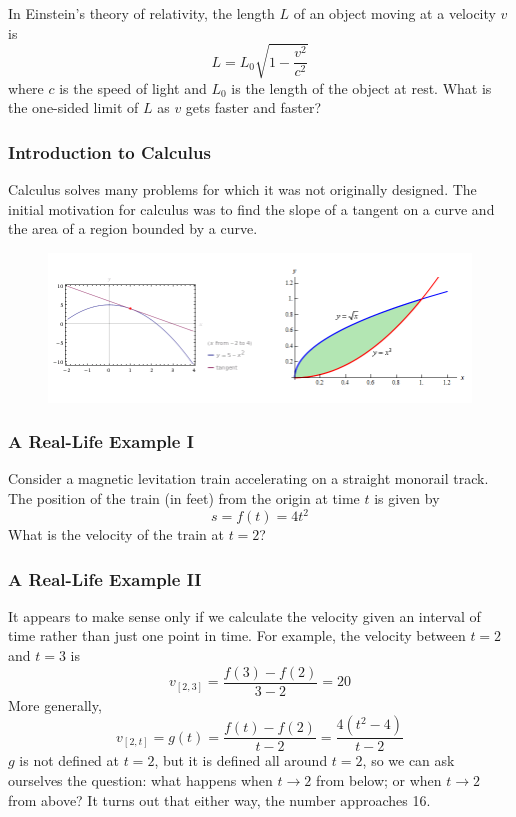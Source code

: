 \documentclass[xcolor=dvipsnames]{beamer}
\begin{document}
\begin{frame}
In Einstein's theory of relativity, the length $L$ of an object moving
at a velocity $v$ is 
\begin{equation}
  \label{eq:aumiepha}
L=L_{0}\sqrt{1-\frac{v^{2}}{c^{2}}}
\end{equation}
where $c$ is the speed of light and $L_{0}$ is the length of the
object at rest. What is the one-sided limit of $L$ as $v$ gets
faster and faster?
\end{frame}

\begin{frame}
  \frametitle{Introduction to Calculus}
\alert{Calculus} solves many problems for which it was not originally
designed. The initial motivation for calculus was to find the slope of
a tangent on a curve and the area of a region bounded by a curve.
  \begin{figure}[h]
    \includegraphics[scale=.35]{./diagrams/regiontangent.png}
  \end{figure}
\end{frame}

\begin{frame}
  \frametitle{A Real-Life Example I}
Consider a magnetic levitation train accelerating on a straight
monorail track. The position of the train (in feet) from the origin at
time $t$ is given by
\begin{equation}
  \label{eq:pupibahk}
  s=f(t)=4t^{2}
\end{equation}
What is the velocity of the train at $t=2$?
\end{frame}

\begin{frame}
  \frametitle{A Real-Life Example II}
It appears to make sense only if we calculate the velocity given an
interval of time rather than just one point in time. For example, the
velocity between $t=2$ and $t=3$ is 
\begin{equation}
  \label{eq:einohkie}
  v_{[2,3]}=\frac{f(3)-f(2)}{3-2}=20
\end{equation}
More generally,
\begin{equation}
  \label{eq:phaedais}
  v_{[2,t]}=g(t)=\frac{f(t)-f(2)}{t-2}=\frac{4(t^{2}-4)}{t-2}
\end{equation}
$g$ is not defined at $t=2$, but it is defined all around $t=2$, so we
can ask ourselves the question: what happens when $t\rightarrow{}2$
from below; or when $t\rightarrow{}2$ from above? It turns out that
either way, the number approaches 16.
\end{frame}
\end{document}
